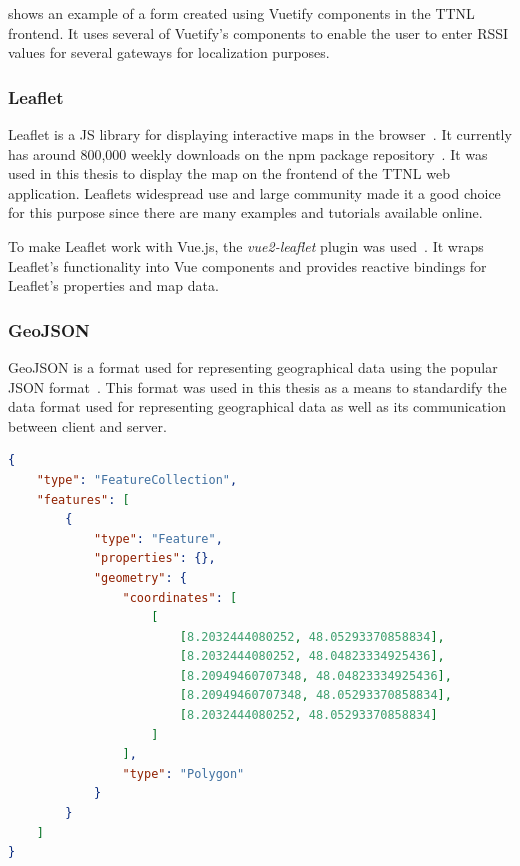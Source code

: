  shows an example of a form created using Vuetify components in the \ac{TTNL} frontend.
It uses several of Vuetify's components to enable the user to enter \ac{RSSI} values for several gateways for localization purposes.

\subsubsection{Leaflet}

Leaflet is a \ac{JS} library for displaying interactive maps in the browser~\cite{volodymyr_agafonkin_leaflet_2023}.
It currently has around 800,000 weekly downloads on the npm package repository~\cite{npm_leaflet_2023}.
It was used in this thesis to display the map on the frontend of the \ac{TTNL} web application.
Leaflets widespread use and large community made it a good choice for this purpose since there are many examples and tutorials available online.

To make Leaflet work with Vue.js, the \emph{vue2-leaflet} plugin was used~\cite{noauthor_vue_nodate}.
It wraps Leaflet's functionality into Vue components and provides reactive bindings for Leaflet's properties and map data.

\subsubsection{GeoJSON}

GeoJSON is a format used for representing geographical data using the popular \ac{JSON} format~\cite{butler_geojson_2016}.
This format was used in this thesis as a means to standardify the data format used for representing geographical data as well as its communication between client and server.

\begin{lstlisting}[language=JSON, float, caption={Example of a GeoJSON that represents a rectangle above the furtwangen city center}, label={lst:geojson-example}]
{
    "type": "FeatureCollection",
    "features": [
        {
            "type": "Feature",
            "properties": {},
            "geometry": {
                "coordinates": [
                    [
                        [8.2032444080252, 48.05293370858834],
                        [8.2032444080252, 48.04823334925436],
                        [8.20949460707348, 48.04823334925436],
                        [8.20949460707348, 48.05293370858834],
                        [8.2032444080252, 48.05293370858834]
                    ]
                ],
                "type": "Polygon"
            }
        }
    ]
}  
\end{lstlisting}


